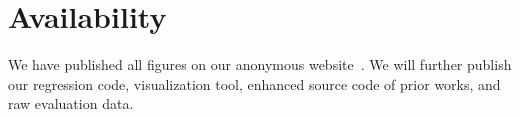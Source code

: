 \section*{Availability}

We have published all figures on our anonymous website~\cite{FigureSite}.
We will further publish our regression code, visualization tool, enhanced source
code of prior works, and raw evaluation data.

